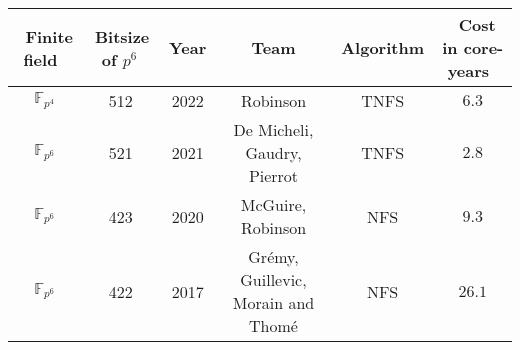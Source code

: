 \documentclass[preview]{standalone}
\begin{document}
\begin{center}
\begin{tabular}{|c|c|c|c|c|c|}
        \hline
        $ \,$ Finite field $ \,$ & $ \,$Bitsize of $p^6 \,$ & $ \,$ Year$ \,$ & $ \,$ Team $ \,$ & $ \,$ Algorithm $ \,$ & $ \,$ Cost in core-years $ \,$ \\
        \hline
        $\mathbb{F}_{p^4}$ & 512& 2022 & Robinson & TNFS & $6.3$\\
        $\mathbb{F}_{p^6}$ & 521& 2021 & De Micheli, Gaudry, Pierrot & TNFS & $2.8$\\
        $\mathbb{F}_{p^6}$ & 423 & 2020 & McGuire, Robinson & NFS & $9.3$\\
        $\mathbb{F}_{p^6}$ & 422 & 2017 & Grémy, Guillevic, Morain and Thomé & NFS & $26.1$\\
        \hline
    \end{tabular}
\end{center}
\end{document}

